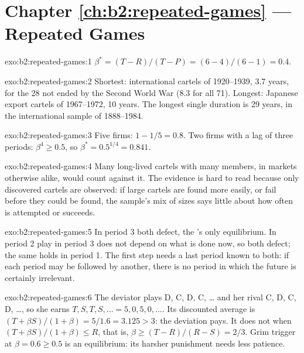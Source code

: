 \section*{Chapter \ref{ch:b2:repeated-games} --- Repeated Games}

\begin{solution}{exo:b2:repeated-games:1}
$\beta^* = (T - R)/(T - P) = (6 - 4)/(6 - 1) = 0.4$.
\end{solution}

\begin{solution}{exo:b2:repeated-games:2}
Shortest: international cartels of 1920--1939, 3.7 years, for the 28 not ended by the Second World War (8.3 for all 71). Longest: Japanese export cartels of 1967--1972, 10 years.
The longest single duration is 29 years, in the international sample of 1888--1984.
\end{solution}

\begin{solution}{exo:b2:repeated-games:3}
Five firms: $1 - 1/5 = 0.8$. Two firms with a lag of three periods: $\beta^4 \ge 0.5$, so $\beta^* = 0.5^{1/4} = 0.841$.
\end{solution}

\begin{solution}{exo:b2:repeated-games:4}
Many long-lived cartels with many members, in markets otherwise alike, would count against it. The evidence is hard
to read because only discovered cartels are observed: if large cartels are found more easily, or fail before they
could be found, the sample's mix of sizes says little about how often  is attempted or succeeds.
\end{solution}

\begin{solution}{exo:b2:repeated-games:5}
In period 3 both defect, the 's only equilibrium. In period 2 play in period 3 does not depend on what is
done now, so both defect; the same holds in period 1. The first step needs a last period known to both: if each
period may be followed by another, there is no period in which the future is certainly irrelevant.
\end{solution}

\begin{solution}{exo:b2:repeated-games:6}
The deviator plays D, C, D, C, \dots{} and her rival C, D, C, D, \dots, so she earns $T, S, T, S, \dots = 5, 0, 5, 0, \dots$. Its
discounted average is $(T + \beta S)/(1 + \beta) = 5/1.6 = 3.125 > 3$: the deviation pays. It does not when $(T + \beta S)/(1 + \beta) \le R$,
that is, $\beta \ge (T - R)/(R - S) = 2/3$. Grim trigger at $\beta = 0.6 \ge 0.5$ is an equilibrium: its harsher punishment needs less
patience.
\end{solution}

